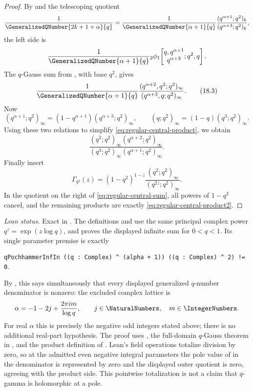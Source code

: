 \documentclass[11pt,a4paper,oneside,openany]{book}
\theoremstyle{definition}
\theoremstyle{remark}
\begin{document}
\begin{proof}
By  and the telescoping quotient
\[
 \frac1{\GeneralizedQNumber{2k+1+\alpha}{q}}
 =\frac1{\GeneralizedQNumber{\alpha+1}{q}}
   \frac{(q^{\alpha+1};q^2)_k}
        {(q^{\alpha+3};q^2)_k},
\]
the left side is
\[
 \frac1{\GeneralizedQNumber{\alpha+1}{q}}
 {}_2\phi_1\!\left[
 \begin{matrix}q,q^{\alpha+1}\\q^{\alpha+3}\end{matrix};
 q^2,q\right].
\]
The $q$-Gauss sum from , with base $q^2$, gives
\[
 \frac1{\GeneralizedQNumber{\alpha+1}{q}}
 \frac{(q^{\alpha+2},q^2;q^2)_\infty}
      {(q^{\alpha+3},q;q^2)_\infty}.
 \tag{18.3}\label{eq:regular-central-product}
\]
Now
\[
 (q^{\alpha+1};q^2)_\infty
 =(1-q^{\alpha+1})(q^{\alpha+3};q^2)_\infty,
 \qquad
 (q;q^2)_\infty=(1-q)(q^3;q^2)_\infty.
\]
Using these two relations to simplify \eqref{eq:regular-central-product}, we obtain
\[
 \frac{(q^2;q^2)_\infty(q^{\alpha+2};q^2)_\infty}
 {(q^3;q^2)_\infty(q^{\alpha+1};q^2)_\infty}.
 \tag{18.4}\label{eq:regular-central-product2}
\]
Finally insert
\[
 \Gamma_{q^2}(z)
 =(1-q^2)^{1-z}
 \frac{(q^2;q^2)_\infty}{(q^{2z};q^2)_\infty}.
\]
In the quotient on the right of \eqref{eq:regular-central-sum}, all powers of $1-q^2$ cancel, and the remaining products are exactly \eqref{eq:regular-central-product2}.
\end{proof}

\emph{Lean status.}  Exact in
.  The definitions
 and  use the
same principal complex power \(q^z=\exp(z\log q)\), and
 proves the displayed infinite
sum for \(0<q<1\).  Its single parameter premise is exactly
\begin{center}
\nolinkurl{qPochhammerInfIn ((q : Complex) ^ (alpha + 1)) ((q : Complex) ^ 2) != 0}.
\end{center}
By , this says simultaneously that
every displayed generalized \(q\)-number denominator is nonzero: the excluded
complex lattice is
\[
 \alpha=-1-2j+\frac{2\pi i m}{\log q},
 \qquad j\in\NaturalNumbers,\quad m\in\IntegerNumbers.
\]
For real \(\alpha\) this is precisely the negative odd integers stated above;
there is no additional real-part hypothesis.  The proof uses
, the full-domain \(q\)-Gauss theorem in
, and the product definition of
.  Lean's field operations totalize division by zero, so
at the admitted even negative integral parameters the pole value of
 in the denominator is represented by zero and the displayed
outer quotient is zero, agreeing with the product side.  This pointwise
totalization is not a claim that \(q\)-gamma is holomorphic at a pole.
\end{document}
